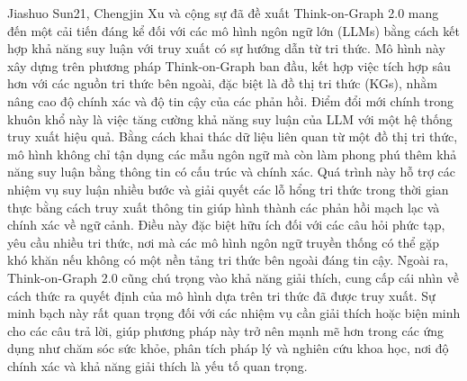 Jiashuo Sun21, Chengjin Xu và cộng sự \cite{tog2_2024} đã đề xuất Think-on-Graph 2.0 mang đến một cải tiến đáng kể đối với các mô hình ngôn ngữ lớn (LLMs) bằng cách kết hợp khả năng suy luận với truy xuất có sự hướng dẫn từ tri thức. Mô hình này xây dựng trên phương pháp Think-on-Graph \cite{tog_2024} ban đầu, kết hợp việc tích hợp sâu hơn với các nguồn tri thức bên ngoài, đặc biệt là đồ thị tri thức (KGs), nhằm nâng cao độ chính xác và độ tin cậy của các phản hồi.
Điểm đổi mới chính trong khuôn khổ này là việc tăng cường khả năng suy luận của LLM với một hệ thống truy xuất hiệu quả. Bằng cách khai thác dữ liệu liên quan từ một đồ thị tri thức, mô hình không chỉ tận dụng các mẫu ngôn ngữ mà còn làm phong phú thêm khả năng suy luận bằng thông tin có cấu trúc và chính xác. Quá trình này hỗ trợ các nhiệm vụ suy luận nhiều bước và giải quyết các lỗ hổng tri thức trong thời gian thực bằng cách truy xuất thông tin giúp hình thành các phản hồi mạch lạc và chính xác về ngữ cảnh. Điều này đặc biệt hữu ích đối với các câu hỏi phức tạp, yêu cầu nhiều tri thức, nơi mà các mô hình ngôn ngữ truyền thống có thể gặp khó khăn nếu không có một nền tảng tri thức bên ngoài đáng tin cậy.
Ngoài ra, Think-on-Graph 2.0 cũng chú trọng vào khả năng giải thích, cung cấp cái nhìn về cách thức ra quyết định của mô hình dựa trên tri thức đã được truy xuất. Sự minh bạch này rất quan trọng đối với các nhiệm vụ cần giải thích hoặc biện minh cho các câu trả lời, giúp phương pháp này trở nên mạnh mẽ hơn trong các ứng dụng như chăm sóc sức khỏe, phân tích pháp lý và nghiên cứu khoa học, nơi độ chính xác và khả năng giải thích là yếu tố quan trọng.
